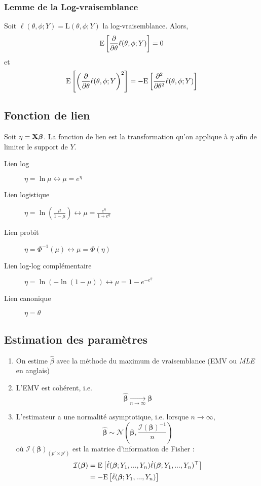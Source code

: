 \documentclass[10pt, french]{article}
\begin{document}
\begin{multicols*}{3}
\subsubsection*{Lemme de la Log-vraisemblance}
Soit $\ell(\theta, \phi ; Y) = \mathrm{L}(\theta, \phi ; Y)$ la log-vraisemblance. Alors,
\[\mathrm{E} \left[ \frac{\partial}{\partial \theta} \ell(\theta, \phi ; Y) \right] = 0\]
et
\[\mathrm{E} \left[ \left( \frac{\partial}{\partial \theta}  \ell(\theta, \phi ; Y \right)^2 \right] = - \mathrm{E} \left[ \frac{\partial^2}{\partial \theta^2} \ell(\theta, \phi ; Y) \right]\]

\subsection*{Fonction de lien}
Soit $\eta = \mathbf{X} \boldsymbol{\beta}$. La fonction de lien est la transformation qu'on applique à $\eta$ afin de limiter le support de $Y$.
\begin{description}
\item[Lien log] $\eta = \ln \mu \leftrightarrow \mu = e^{\eta}$
\item[Lien logistique] $\eta = \ln \left( \frac{\mu}{1 - \mu} \right) \leftrightarrow \mu = \frac{e^{\eta}}{1 + e^{\eta}}$

\item[Lien probit] $\eta = \Phi^{-1}(\mu) \leftrightarrow \mu = \Phi(\eta)$

\item[Lien log-log complémentaire] $\eta = \ln ( - \ln (1 - \mu)) \leftrightarrow \mu = 1 - e^{-e^{\eta}}$

\item[Lien canonique] $\eta = \theta$ 
\end{description}

\subsection*{Estimation des paramètres}
\begin{enumerate}[label=\faAngleRight]
\item On estime $\hat{\beta}$ avec la méthode du maximum de vraisemblance (EMV ou \emph{MLE} en anglais)

\item L'EMV est cohérent, i.e.
\[\hat{\bm{\beta}} \underset{n \to \infty}{\longrightarrow} \bm{\beta} \]

\item L'estimateur a une normalité asymptotique, i.e. lorsque $n \to \infty$,
\[  \hat{\bm{\beta}} \sim \mathcal{N} \left( \bm{\beta}, \frac{\mathcal{I}(\bm{\beta})^{-1}}{n} \right)    \]
où $\mathcal{I}(\bm{\beta})_{(p' \times p')}$ est la matrice d'information de Fisher : 
\begin{align*}
\mathcal{I}(\bm{\beta}) & = \mathrm{E} \left[ \dot{\ell}(\bm{\beta} ; Y_1, ..., Y_n) \dot{\ell}(\bm{\beta} ; Y_1, ..., Y_n)^{\top}  \right] \\
	& = - \mathrm{E} \left[ \ddot{\ell}(\bm{\beta} ; Y_1, ..., Y_n) \right] \\
\end{align*}


\end{enumerate}
\end{multicols*}
\end{document}
